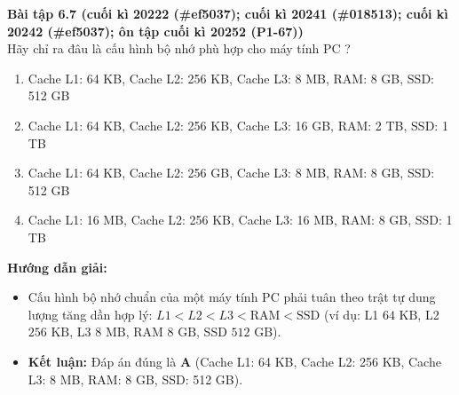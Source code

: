 \textbf{Bài tập 6.7 (cuối kì 20222 (\#ef5037); cuối kì 20241 (\#018513); cuối kì 20242 (\#ef5037); ôn tập cuối kì 20252 (P1-67))}\\
Hãy chỉ ra đâu là cấu hình bộ nhớ phù hợp cho máy tính PC ?
\begin{enumerate}[label=\Alph*.]
    \item Cache L1: 64 KB, Cache L2: 256 KB, Cache L3: 8 MB, RAM: 8 GB, SSD: 512 GB
    \item Cache L1: 64 KB, Cache L2: 256 KB, Cache L3: 16 GB, RAM: 2 TB, SSD: 1 TB
    \item Cache L1: 64 KB, Cache L2: 256 GB, Cache L3: 8 MB, RAM: 8 GB, SSD: 512 GB
    \item Cache L1: 16 MB, Cache L2: 256 KB, Cache L3: 16 MB, RAM: 8 GB, SSD: 1 TB
\end{enumerate}
\textbf{Hướng dẫn giải:}
\begin{itemize}
    \item Cấu hình bộ nhớ chuẩn của một máy tính PC phải tuân theo trật tự dung lượng tăng dần hợp lý: $L1 < L2 < L3 < \text{RAM} < \text{SSD}$ (ví dụ: L1 $64\text{ KB}$, L2 $256\text{ KB}$, L3 $8\text{ MB}$, RAM $8\text{ GB}$, SSD $512\text{ GB}$).
    \item \textbf{Kết luận:} Đáp án đúng là \textbf{A} (Cache L1: 64 KB, Cache L2: 256 KB, Cache L3: 8 MB, RAM: 8 GB, SSD: 512 GB).
\end{itemize}

